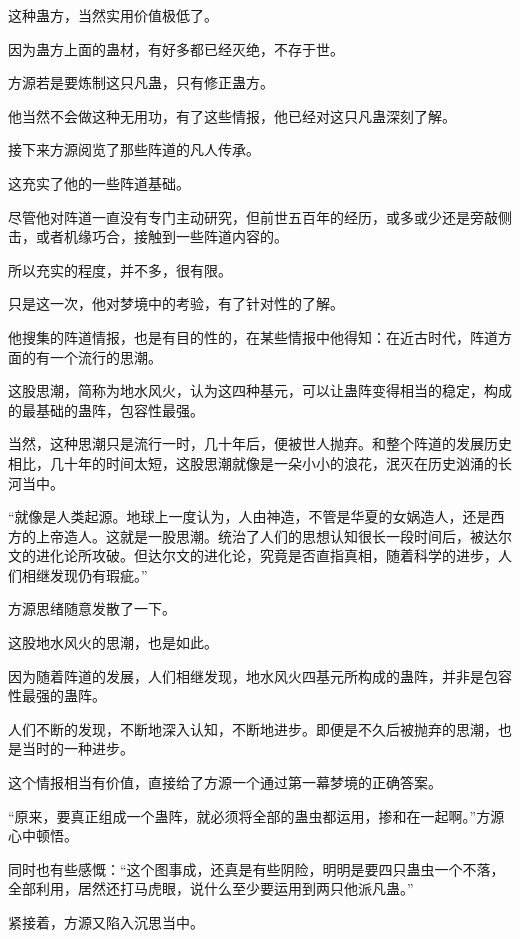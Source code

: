 
\begin{this_body}

这种蛊方，当然实用价值极低了。

因为蛊方上面的蛊材，有好多都已经灭绝，不存于世。

方源若是要炼制这只凡蛊，只有修正蛊方。

他当然不会做这种无用功，有了这些情报，他已经对这只凡蛊深刻了解。

接下来方源阅览了那些阵道的凡人传承。

这充实了他的一些阵道基础。

尽管他对阵道一直没有专门主动研究，但前世五百年的经历，或多或少还是旁敲侧击，或者机缘巧合，接触到一些阵道内容的。

所以充实的程度，并不多，很有限。

只是这一次，他对梦境中的考验，有了针对性的了解。

他搜集的阵道情报，也是有目的性的，在某些情报中他得知：在近古时代，阵道方面的有一个流行的思潮。

这股思潮，简称为地水风火，认为这四种基元，可以让蛊阵变得相当的稳定，构成的最基础的蛊阵，包容性最强。

当然，这种思潮只是流行一时，几十年后，便被世人抛弃。和整个阵道的发展历史相比，几十年的时间太短，这股思潮就像是一朵小小的浪花，泯灭在历史汹涌的长河当中。

“就像是人类起源。地球上一度认为，人由神造，不管是华夏的女娲造人，还是西方的上帝造人。这就是一股思潮。统治了人们的思想认知很长一段时间后，被达尔文的进化论所攻破。但达尔文的进化论，究竟是否直指真相，随着科学的进步，人们相继发现仍有瑕疵。”

方源思绪随意发散了一下。

这股地水风火的思潮，也是如此。

因为随着阵道的发展，人们相继发现，地水风火四基元所构成的蛊阵，并非是包容性最强的蛊阵。

人们不断的发现，不断地深入认知，不断地进步。即便是不久后被抛弃的思潮，也是当时的一种进步。

这个情报相当有价值，直接给了方源一个通过第一幕梦境的正确答案。

“原来，要真正组成一个蛊阵，就必须将全部的蛊虫都运用，掺和在一起啊。”方源心中顿悟。

同时也有些感慨：“这个图事成，还真是有些阴险，明明是要四只蛊虫一个不落，全部利用，居然还打马虎眼，说什么至少要运用到两只他派凡蛊。”

紧接着，方源又陷入沉思当中。


\end{this_body}
